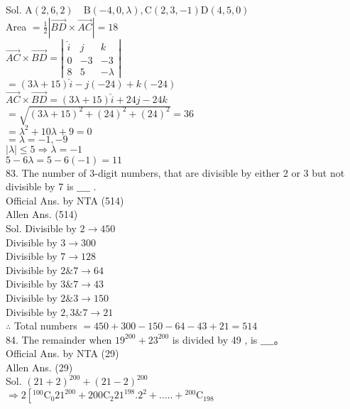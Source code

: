 \documentclass[10pt]{article}
\begin{document}
Sol. \(\mathrm{A}(2,6,2) \quad \mathrm{B}(-4,0, \lambda), \mathrm{C}(2,3,-1) \mathrm{D}(4,5,0)\)\\
Area \(=\frac{1}{2}|\overrightarrow{B D} \times \overrightarrow{A C}|=18\)\\
\(\overrightarrow{A C} \times \overrightarrow{B D}=\left|\begin{array}{ccc}\hat{i} & j & k \\ 0 & -3 & -3 \\ 8 & 5 & -\lambda\end{array}\right|\)\\
\(=(3 \lambda+15) \hat{i}-j(-24)+k(-24)\)\\
\(\overrightarrow{A C} \times \overrightarrow{B D}=(3 \lambda+15) \hat{i}+24 j-24 k\)\\
\(=\sqrt{(3 \lambda+15)^{2}+(24)^{2}+(24)^{2}}=36\)\\
\(=\lambda^{2}+10 \lambda+9=0\)\\
\(=\lambda=-1,-9\)\\
\(|\lambda| \leq 5 \Rightarrow \lambda=-1\)\\
\(5-6 \lambda=5-6(-1)=11\)\\
83. The number of 3-digit numbers, that are divisible by either 2 or 3 but not divisible by 7 is \(\_\_\_\_\) .\\
Official Ans. by NTA (514)\\
Allen Ans. (514)\\
Sol. Divisible by \(2 \rightarrow 450\)\\
Divisible by \(3 \rightarrow 300\)\\
Divisible by \(7 \rightarrow 128\)\\
Divisible by \(2 \& 7 \rightarrow 64\)\\
Divisible by \(3 \& 7 \rightarrow 43\)\\
Divisible by \(2 \& 3 \rightarrow 150\)\\
Divisible by \(2,3 \& 7 \rightarrow 21\)\\
\(\therefore\) Total numbers \(=450+300-150-64-43+21=514\)\\
84. The remainder when \(19^{200}+23^{200}\) is divided by 49 , is \(\_\_\_\_\)。\\
Official Ans. by NTA (29)\\
Allen Ans. (29)\\
Sol. \((21+2)^{200}+(21-2)^{200}\)\\
\(\Rightarrow 2\left[{ }^{100} \mathrm{C}_{0} 21^{200}+200 \mathrm{C}_{2} 21^{198} .2^{2}+\ldots . .+{ }^{200} \mathrm{C}_{198}\right.\)\\
\end{document}
